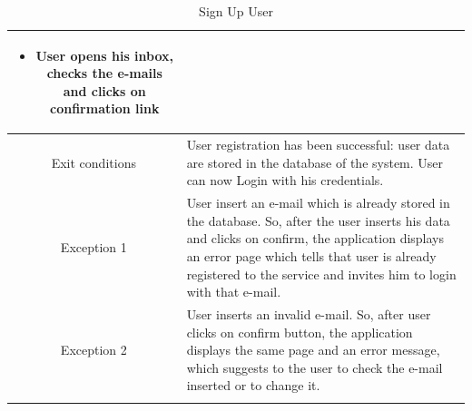 \documentclass[table, 12pt]{article}
\begin{document}
\begin{longtable}{ | c | p{10cm} | }
\begin{itemize}[nosep,after=\strut]
        \item User opens his inbox, checks the e-mails and clicks on confirmation link
    \end{itemize}                                                                                                                                                                                                                                             \\
    \hline
    Exit conditions  & User registration has been successful: user data are stored in the database of the system. User can now Login with his credentials.                                                                                                                                    \\
    \hline
    \hline
    Exception 1      & User insert an e-mail which is already stored in the database. So, after the user inserts his data and clicks on confirm, the application displays an error page which tells that user is already registered to the service and invites him to login with that e-mail. \\
    \hline
    Exception 2      & User inserts an invalid e-mail. So, after user clicks on confirm button, the application displays the same page and an error message, which suggests to the user to check the e-mail inserted or to change it.                                                         \\
    \hline
    \caption{Sign Up User}                                                                                                                                                                                                                                                                    \\
\end{longtable}
\end{document}
